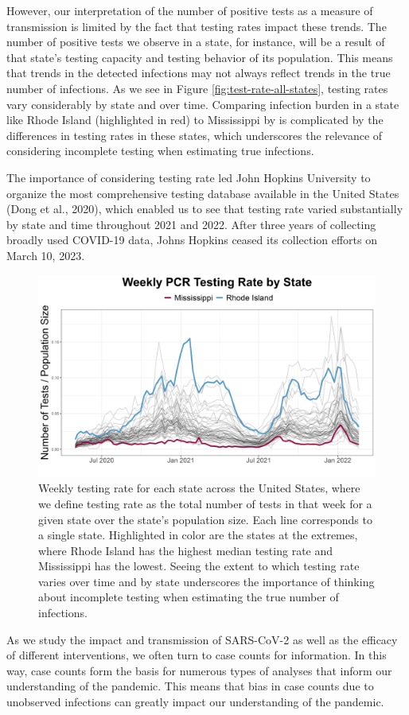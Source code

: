 \documentclass[12pt,twoside]{smiththesis}
\begin{document}
However, our interpretation of the number of positive tests as a measure of transmission is limited by the fact that testing rates impact these trends. The number of positive tests we observe in a state, for instance, will be a result of that state's testing capacity and testing behavior of its population. This means that trends in the detected infections may not always reflect trends in the true number of infections. As we see in Figure \ref{fig:test-rate-all-states}, testing rates vary considerably by state and over time. Comparing infection burden in a state like Rhode Island (highlighted in red) to Mississippi by is complicated by the differences in testing rates in these states, which underscores the relevance of considering incomplete testing when estimating true infections.

The importance of considering testing rate led John Hopkins University to organize the most comprehensive testing database available in the United States (Dong et al., 2020), which enabled us to see that testing rate varied substantially by state and time throughout 2021 and 2022. After three years of collecting broadly used COVID-19 data, Johns Hopkins ceased its collection efforts on March 10, 2023.
\begin{figure}
\includegraphics[width=1\linewidth]{./figure/testing_all} \caption{\label{fig:test-rate-all-states}Weekly testing rate for each state across the United States, where we define testing rate as the total number of tests in that week for a given state over the state's population size. Each line corresponds to a single state. Highlighted in color are the states at the extremes, where Rhode Island has the highest median testing rate and Mississippi has the lowest. Seeing the extent to which testing rate varies over time and by state underscores the importance of thinking about incomplete testing when estimating the true number of infections.}\label{fig:unnamed-chunk-6}
\end{figure}
As we study the impact and transmission of SARS-CoV-2 as well as the efficacy of different interventions, we often turn to case counts for information. In this way, case counts form the basis for numerous types of analyses that inform our understanding of the pandemic. This means that bias in case counts due to unobserved infections can greatly impact our understanding of the pandemic.
\end{document}
